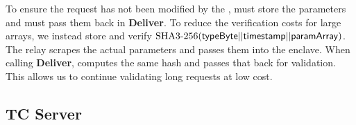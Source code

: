 To ensure the request has not been modified by the \medname, \tcont must store the parameters and \tc must pass them back in {\bf Deliver}.
To reduce the verification costs for large arrays, we instead store and verify $\text{SHA3-256}({\sf typeByte} || {\sf timestamp} || {\sf paramArray})$.
The relay scrapes the actual parameters and passes them into the enclave.
When calling {\bf Deliver}, \enclaveprog computes the same hash and passes that back for validation.
This allows us to continue validating long requests at low cost.



\subsection{TC Server}


